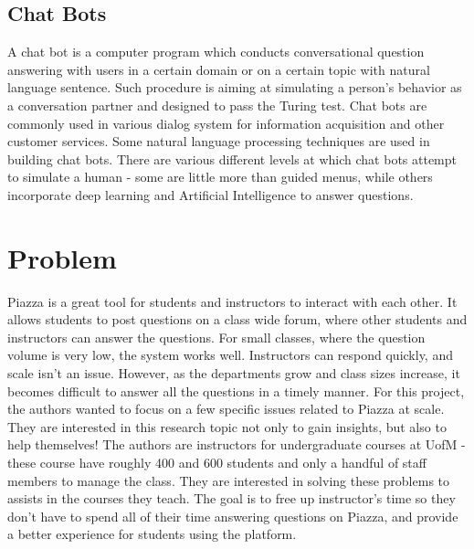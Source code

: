 \documentclass[sigconf]{acmart}
\begin{document}
\subsection{Chat Bots}
A chat bot is a computer program which conducts conversational question answering with users in a certain domain or on a certain topic with natural language sentence. Such procedure is aiming at simulating a person’s behavior as a conversation partner and designed to pass the Turing test. Chat bots are commonly used in various dialog system for information acquisition and other customer services. Some natural language processing techniques are used in building chat bots. There are various different levels at which chat bots attempt to simulate a human - some are little more than guided menus, while others incorporate deep learning and Artificial Intelligence to answer questions.

\section{Problem}
Piazza is a great tool for students and instructors to interact with each other. It allows students to post questions on a class wide forum, where other students and instructors can answer the questions. For small classes, where the question volume is very low, the system works well. Instructors can respond quickly, and scale isn't an issue. However, as the departments grow and class sizes increase, it becomes difficult to answer all the questions in a timely manner. For this project, the authors wanted to focus on a few specific issues related to Piazza at scale. They are interested in this research topic not only to gain insights, but also to help themselves! The authors are instructors for undergraduate courses at UofM - these course have roughly 400 and 600 students and only a handful of staff members to manage the class. They are interested in solving these problems to assists in the courses they teach. The goal is to free up instructor's time so they don't have to spend all of their time answering questions on Piazza, and provide a better experience for students using the platform.
\end{document}
